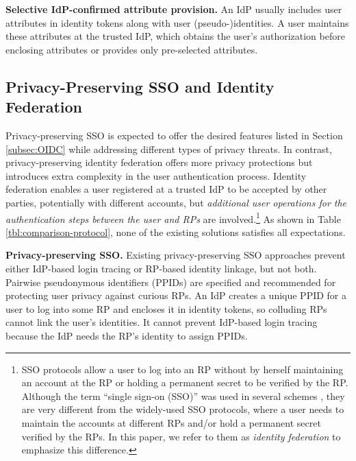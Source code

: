 \noindent\textbf{Selective IdP-confirmed attribute provision.}
An IdP usually includes user attributes in identity tokens \cite{OpenIDConnect,rfc6749} along with user (pseudo-)identities.
A user maintains these attributes at the trusted IdP,
which obtains the user's authorization before enclosing attributes or provides only pre-selected attributes.

\subsection{Privacy-Preserving SSO and Identity Federation}
\label{subsec-solutions}

\newc
Privacy-preserving SSO is expected to offer the desired features listed in Section \ref{subsec:OIDC} while addressing different types of privacy threats.
In contrast, privacy-preserving identity federation offers more privacy protections but introduces extra complexity in the user authentication process.
Identity federation enables a user registered at a trusted IdP to be accepted by other parties, potentially with different accounts,
but \emph{additional user operations for the authentication steps between the user and RPs} are involved.\footnote{\newc SSO protocols \cite{OpenIDConnect,rfc6749, SAML, SAMLIdentifier} allow a user to log into an RP without by herself maintaining an account at the RP or holding a permanent secret to be verified by the RP. Although the term ``single sign-on (SSO)'' was used in several schemes \cite{PseudoID, Opaak, ELPASSO, WangWS13, HanCSTW18, HanCSTWW20}, they are very different from the widely-used SSO protocols, where a user needs to maintain the accounts at different RPs and/or hold a permanent secret verified by the RPs. In this paper, we refer to them as \emph{identity federation} to emphasize this difference.}
As shown in Table \ref{tbl:comparison-protocol}, none of the existing solutions satisfies all expectations.


\noindent\textbf{Privacy-preserving SSO.}
Existing privacy-preserving SSO approaches \cite{BrowserID, SPRESSO, NIST2017draft} prevent either IdP-based login tracing or RP-based identity linkage, but not both.
\oldc
Pairwise pseudonymous identifiers (PPIDs) are specified \cite{OpenIDConnect, SAMLIdentifier} and recommended \cite{NIST2017draft}
for protecting user privacy against curious RPs.
An IdP creates a unique PPID for a user to log into some RP and encloses it in identity tokens, so colluding RPs cannot link the user's identities.
It cannot prevent IdP-based login tracing because the IdP needs the RP's identity to assign PPIDs.

